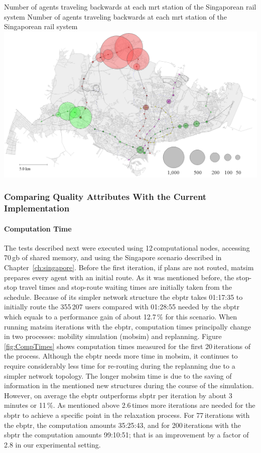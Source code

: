 \createfigure
{Number of agents traveling backwards at each \protect\gls{mrt} station of the Singaporean rail system}
{Number of agents traveling backwards at each \protect\gls{mrt} station of the Singaporean rail system}
{\label{fig:Backwards}}
{\includegraphics[width=1.0\textwidth]{extending/figures/ebr/Backwards.png}}
{}

\subsubsection{Comparing Quality Attributes With the Current Implementation}

\paragraph{Computation Time}

The tests described next were executed using 12\,computational nodes, accessing 70\,\gls{gb} of shared memory, and using the Singapore scenario described in Chapter~\ref{ch:singapore}. Before the first iteration, if plans are not routed, \gls{matsim} prepares every agent with an initial route. As it was mentioned before, the stop-stop travel times and stop-route waiting times are initially taken from the schedule. Because of its simpler network structure the \gls{ebptr} takes 01:17:35 to initially route the 355\,207 users compared with 01:28:55 needed by the \gls{sbptr} which equals to a performance gain of about 12.7\,\% for this scenario. When running \gls{matsim} iterations with the \gls{ebptr}, computation times principally change in two processes: mobility simulation (mobsim) and replanning. Figure \ref{fig:CompTimes} shows computation times measured for the first 20\,iterations of the process. Although the \gls{ebptr} needs more time in \gls{mobsim}, it continues to require considerably less time for re-routing during the replanning due to a simpler network topology. The longer mobsim time is due to the saving of information in the mentioned new structures during the course of the simulation. However, on average the \gls{ebptr} outperforms \gls{sbptr} per iteration by about 3\,minutes or 11\,\%. As mentioned above 2.6\,times more iterations are needed for the \gls{sbptr} to achieve a specific point in the relaxation process. For 77\,iterations with the \gls{ebptr}, the computation amounts 35:25:43, and for 200\,iterations with the \gls{sbptr} the computation amounts 99:10:51; that is an improvement by a factor of 2.8 in our experimental setting.

